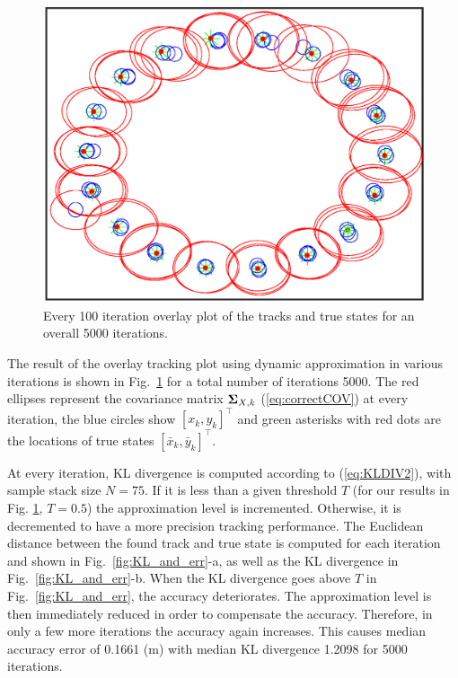 \begin{figure}[tb]
  \centering
  \includegraphics[width=0.9\columnwidth]{img/Tracks_plot_cropped.eps}
  \caption{Every 100 iteration overlay plot of the tracks and true states for an overall 5000 iterations.}
  \label{fig:track_res}
\end{figure}

The result of the overlay tracking plot using dynamic approximation in various iterations is shown in Fig.~\ref{fig:track_res} for a total number of iterations 5000. 
The red ellipses represent the covariance matrix ${\bf \Sigma}_{X,k}$ (\ref{eq:correctCOV}) at every iteration, the blue circles show $[x_k, y_k]^\intercal$ and green asterisks with red dots are the locations of true states $[\bar{x}_k, \bar{y}_k]^\intercal$. 

At every iteration, KL divergence is computed according to (\ref{eq:KLDIV2}), with sample stack size $N = 75$.  If it is less than a given threshold $T$ (for our results in Fig. \ref{fig:track_res}, $T = 0.5$) the approximation level is incremented. Otherwise, it is decremented to have a more precision tracking performance. The Euclidean distance between the found track and true state is computed for each iteration and shown in Fig.~\ref{fig:KL_and_err}-a, as well as the KL divergence in Fig.~\ref{fig:KL_and_err}-b. When the KL divergence goes above $T$ in Fig.~\ref{fig:KL_and_err}, the accuracy deteriorates. The approximation level is then immediately reduced in order to compensate the accuracy. Therefore, in only a few more iterations the accuracy again increases. This causes median accuracy error of 0.1661 (m) with median KL divergence 1.2098 for 5000 iterations.

